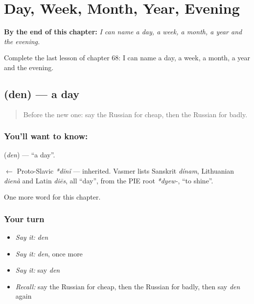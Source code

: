 
\chapter{Day, Week, Month, Year, Evening}
\label{ch:ru-day-week-month-year-evening}

\begin{chapteropening}
\textbf{By the end of this chapter:} \emph{I can name a day, a week, a month, a year and the evening.}

Complete the last lesson of chapter 68: I can name a day, a week, a month, a year and the evening.
\end{chapteropening}

\section[\texorpdfstring{\ru{день} (den)}{день (den)}]{ (den) — a day}

\label{lesson:RU-C68-day}



\begin{quote}
Before the new one: say the Russian for cheap, then the Russian for badly.
\end{quote}

\subsection*{You'll want to know: }
\textbf{} (\emph{den}) — \textquotedblleft{}a day\textquotedblright{}.

\begin{cousinweb}
\textbf{} $\leftarrow$ Proto-Slavic \emph{*dĭnĭ} — inherited. Vasmer lists Sanskrit \emph{dínam}, Lithuanian \emph{dienà} and Latin \emph{diēs}, all \textquotedblleft{}day\textquotedblright{}, from the PIE root \emph{*dyew-}, \textquotedblleft{}to shine\textquotedblright{}.
\end{cousinweb}

\begin{grammarlens}[title={What you've built}]
One more word for this chapter.
\end{grammarlens}

\subsection*{Your turn}
\begin{itemize}
\raggedright
  \item \emph{Say it:} \emph{den}
  \item \emph{Say it:} \emph{den}, once more
  \item \emph{Say it:} say \emph{den}
  \item \emph{Recall:} say the Russian for cheap, then the Russian for badly, then say \emph{den} again
\end{itemize}

